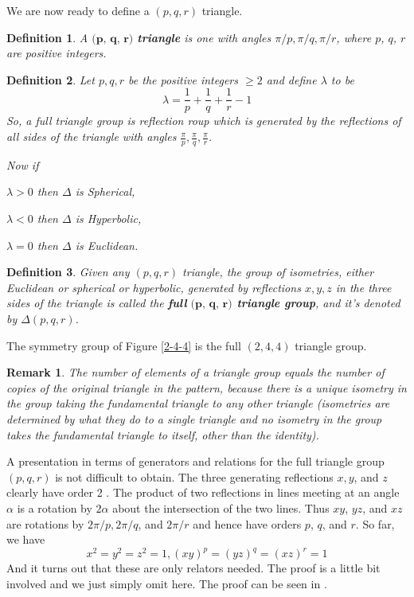 \documentclass{article}
\newtheorem{Def}{Definition}[section]
\newtheorem{Rk}{Remark}[section]
\begin{document}
We are now ready to define a $(p, q, r)$ triangle.
\begin{Def}
    A $\textbf{(p, q, r)}$ \textbf{triangle} is one with angles $\pi/p, \pi/q, \pi/r$, where $p$, $q$, $r$ are positive integers.
\end{Def}
\begin{Def}
    Let $p, q, r$ be the positive integers $\geq 2$ and define $\lambda$ to be
    $$
        \lambda=\frac{1}{p}+\frac{1}{q}+\frac{1}{r}-1
    $$
    So, a full triangle group  is reflection roup which is generated by the reflections of all sides of the triangle with angles $\frac{\pi}{p}, \frac{\pi}{q}, \frac{\pi}{r}$.

    Now if
    \item $\lambda>0$ then $\Delta$ is Spherical,
    \item $\lambda<0$ then $\Delta$ is Hyperbolic,
    \item $\lambda=0$ then $\Delta$ is Euclidean.
\end{Def}
\begin{Def}
    Given any $(p, q, r)$ triangle, the group of isometries, either Euclidean or spherical or hyperbolic, generated by reflections $x, y, z$ in the three sides of the triangle is called the \textbf{full} \textbf{$\textbf{(p, q, r)}$ triangle group}, and it's denoted by $\Delta(p, q, r)$.
\end{Def}
The symmetry group of Figure \ref{2-4-4} is the full $(2,4,4)$ triangle group.
\begin{Rk}
    The number of elements of a triangle group equals the number of copies of the original triangle in the pattern, because there is a unique isometry in the group taking the fundamental triangle to any other triangle (isometries are determined by what they do to a single triangle and no isometry in the group takes the fundamental triangle to itself, other than the identity).
\end{Rk}
A presentation in terms of generators and relations for the full triangle group $(p, q, r)$ is not difficult to obtain. The three generating reflections $x, y$, and $z$ clearly have order 2 . The product of two reflections in lines meeting at an angle $\alpha$ is a rotation by $2 \alpha$ about the intersection of the two lines. Thus $x y$, $y z$, and $x z$ are rotations by $2 \pi / p, 2 \pi / q$, and $2 \pi / r$ and hence have orders $p$, $q$, and $r$. So far, we have
$$
    x^2=y^2=z^2=1,(x y)^p=(y z)^q=(x z)^r=1
$$
And it turns out that these are only relators needed. The proof is a little bit involved and we just simply omit here. The proof can be seen in \cite{Tgt}.
\end{document}
